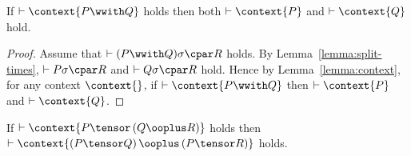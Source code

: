 \documentclass[UKenglish,acmsmall,authorversion]{acmart}
\theoremstyle{plain}
\begin{document}
\begin{lemma}
If $\vdash \context{ P \wwith Q }$ holds
then both $\vdash \context{ P }$ and $\vdash \context{ Q }$ hold.
\end{lemma}
\begin{proof}
Assume that $\vdash \left(P \wwith Q\right)\mathclose\sigma \cpar R$ holds.
By Lemma~\ref{lemma:split-times}, $\vdash P\mathclose\sigma \cpar R$ and $\vdash Q\mathclose\sigma \cpar R$ hold.
Hence by Lemma~\ref{lemma:context}, for any context $\context{}$, if $\vdash \context{ P \wwith Q }$ then $\vdash \context{ P }$ and $\vdash \context{ Q }$.
\end{proof}
%

\begin{lemma}
If $\vdash \context{ P \tensor  \left( Q \ooplus R \right) }$ holds
 then $\vdash \context{ \left( P \tensor Q \right) \ooplus \left( P \tensor R \right) }$ holds.
\end{lemma}
\end{document}
